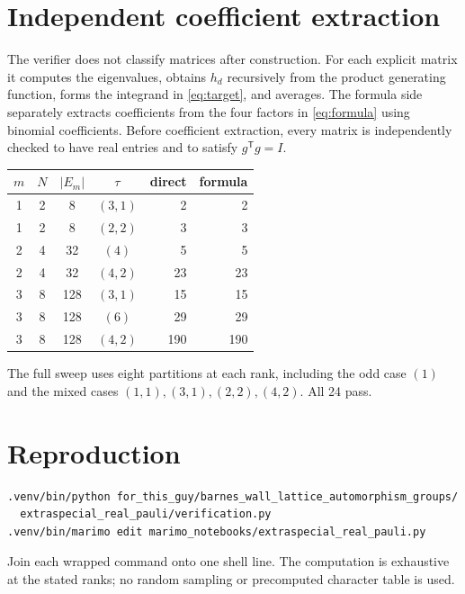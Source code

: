 \documentclass[11pt]{article}
\begin{document}
\section{Independent coefficient extraction}
The verifier does not classify matrices after construction.  For each
explicit matrix it computes the eigenvalues, obtains $h_d$ recursively from
the product generating function, forms the integrand in \eqref{eq:target},
and averages.  The formula side separately extracts coefficients from the
four factors in \eqref{eq:formula} using binomial coefficients.
Before coefficient extraction, every matrix is independently checked to have
real entries and to satisfy $g^{\mathsf T}g=I$.

\begin{center}
\begin{tabular}{@{}c@{\quad}c@{\quad}c@{\quad}c@{\qquad}r@{\qquad}r@{}}\toprule
$m$&$N$&$|E_m|$&$\tau$&direct&formula\\\midrule
1&2&8&$(3,1)$&2&2\\
1&2&8&$(2,2)$&3&3\\
2&4&32&$(4)$&5&5\\
2&4&32&$(4,2)$&23&23\\
3&8&128&$(3,1)$&15&15\\
3&8&128&$(6)$&29&29\\
3&8&128&$(4,2)$&190&190\\\bottomrule
\end{tabular}
\end{center}
The full sweep uses eight partitions at each rank, including the odd case
$(1)$ and the mixed cases $(1,1),(3,1),(2,2),(4,2)$.  All 24 pass.

\section{Reproduction}
\begin{verbatim}
.venv/bin/python for_this_guy/barnes_wall_lattice_automorphism_groups/
  extraspecial_real_pauli/verification.py
.venv/bin/marimo edit marimo_notebooks/extraspecial_real_pauli.py
\end{verbatim}
Join each wrapped command onto one shell line.  The computation is exhaustive
at the stated ranks; no random sampling or precomputed character table is
used.
\end{document}
